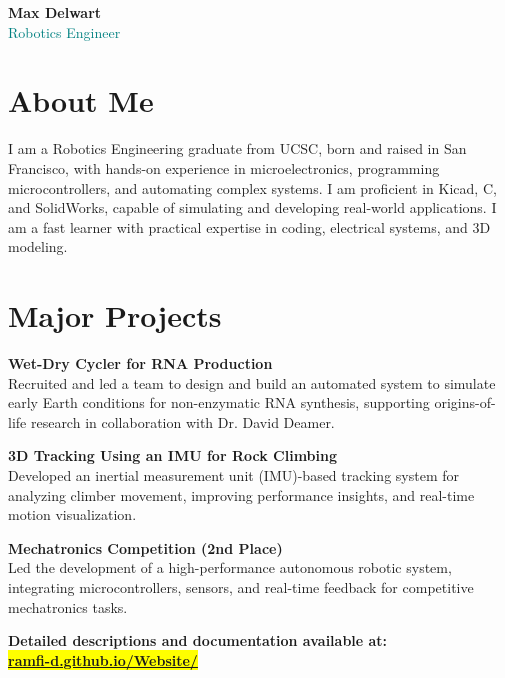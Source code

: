 \documentclass[a4paper,9pt]{article}
\begin{document}
\begin{center}
    {\Large \textbf{Max Delwart}} \\
    {\small \textcolor{teal}{Robotics Engineer}} \\
    \vspace{0.3em}
\end{center}

\section*{About Me}
 I am a Robotics Engineering graduate from UCSC, born and raised in San Francisco, with hands-on experience in microelectronics, programming microcontrollers, and automating complex systems. I am proficient in Kicad, C, and SolidWorks, capable of simulating and developing real-world applications. I am a fast learner with practical expertise in coding, electrical systems, and 3D modeling.\normalsize

\section*{Major Projects}

\small 

\textbf{Wet-Dry Cycler for RNA Production} \\
Recruited and led a team to design and build an automated system to simulate early Earth conditions for non-enzymatic RNA synthesis, supporting origins-of-life research in collaboration with Dr. David Deamer.

\textbf{3D Tracking Using an IMU for Rock Climbing} \\
Developed an inertial measurement unit (IMU)-based tracking system for analyzing climber movement, improving performance insights, and real-time motion visualization.

\textbf{Mechatronics Competition (2nd Place)} \\
Led the development of a high-performance autonomous robotic system, integrating microcontrollers, sensors, and real-time feedback for competitive mechatronics tasks.

\textbf{Detailed descriptions and documentation available at:} \\
\colorbox{yellow}{\href{https://ramfi-d.github.io/Website/}{\textbf{ramfi-d.github.io/Website/}}}
\end{document}
